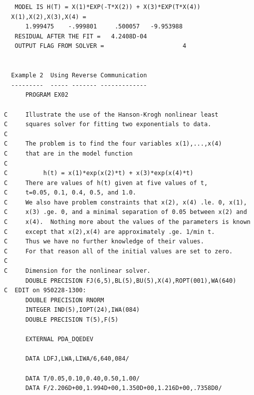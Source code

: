 \documentclass[11pt,twoside]{article}
\begin{document}
\begin{verbatim}
   MODEL IS H(T) = X(1)*EXP(-T*X(2)) + X(3)*EXP(T*X(4))
  X(1),X(2),X(3),X(4) =
      1.999475    -.999801     .500057   -9.953988
   RESIDUAL AFTER THE FIT =   4.2408D-04
   OUTPUT FLAG FROM SOLVER =                      4


  Example 2  Using Reverse Communication
  ---------  ----- ------- -------------
      PROGRAM EX02

C     Illustrate the use of the Hanson-Krogh nonlinear least
C     squares solver for fitting two exponentials to data.
C
C     The problem is to find the four variables x(1),...,x(4)
C     that are in the model function
C
C          h(t) = x(1)*exp(x(2)*t) + x(3)*exp(x(4)*t)
C     There are values of h(t) given at five values of t,
C     t=0.05, 0.1, 0.4, 0.5, and 1.0.
C     We also have problem constraints that x(2), x(4) .le. 0, x(1),
C     x(3) .ge. 0, and a minimal separation of 0.05 between x(2) and
C     x(4).  Nothing more about the values of the parameters is known
C     except that x(2),x(4) are approximately .ge. 1/min t.
C     Thus we have no further knowledge of their values.
C     For that reason all of the initial values are set to zero.
C
C     Dimension for the nonlinear solver.
      DOUBLE PRECISION FJ(6,5),BL(5),BU(5),X(4),ROPT(001),WA(640)
C  EDIT on 950228-1300:
      DOUBLE PRECISION RNORM
      INTEGER IND(5),IOPT(24),IWA(084)
      DOUBLE PRECISION T(5),F(5)

      EXTERNAL PDA_DQEDEV

      DATA LDFJ,LWA,LIWA/6,640,084/

      DATA T/0.05,0.10,0.40,0.50,1.00/
      DATA F/2.206D+00,1.994D+00,1.350D+00,1.216D+00,.7358D0/


\end{verbatim}
\end{document}
